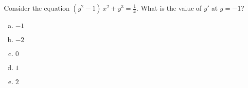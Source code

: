 \item Consider the equation $\displaystyle (y^2-1)\,x^2+y^3=\frac{1}{x}.$ What is the value of $y'$ at $y=-1$?
\\[0.2in]

\begin{enumerate}[(a)]
    \item $-1$
    
    \item $-2$
    
    \item $0$
    
    \item $1$
    
    \item $2$
\end{enumerate}